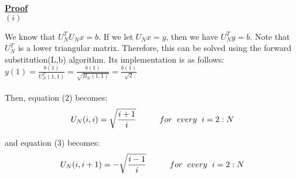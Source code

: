 \documentclass{article}
\DeclareMathOperator{\1}{\mathit{1}}
\numberwithin{figure}{section} %
\numberwithin{table}{section}
\begin{document}
\underline{\textbf {Proof}} \\
\((i)\)
\par We know that \(U_N^T  U_N  x = b\). If we let \(U_N x = y\), then we have \(U_N^T y = b\). Note that \(U_N^T\) is a lower triangular matrix. Therefore, this can be solved using the forward substitution(L,b) algorithm. Its implementation is as follows:\\
\indent \(y(1) = \frac{b(1)}{U_N^T(1,1)} = \frac{b(1)}{\sqrt{B_N(1,1)}} = \frac{b(1)}{\sqrt{2}}\) \\\\
Then, equation (2) becomes:\\
\begin{equation}
	U_N(i,i) = \sqrt{\frac{i+1}{i}} \hspace{1 cm} for \hspace{2 mm} every \hspace{2 mm} i=2:N
\end{equation}

and equation (3) becomes: \\
\begin{equation}
	U_N(i,i+1) = -\sqrt{\frac{i-1}{i}} \hspace{1 cm} for \hspace{2 mm} every \hspace{2 mm} i=2:N
\end{equation}
\end{document}
